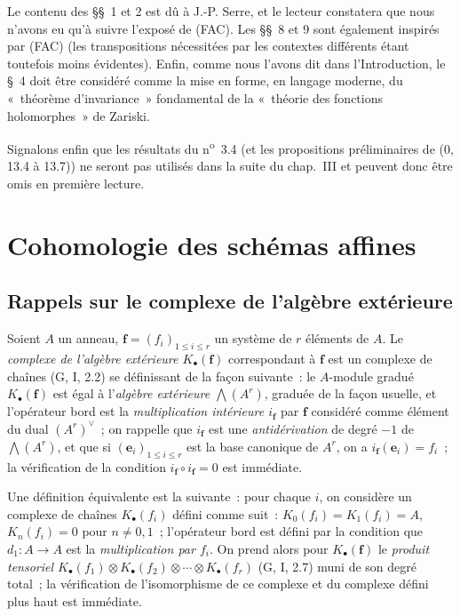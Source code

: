 
Le contenu des \S\S~1 et 2 est dû à J.-P. Serre, et le lecteur constatera que
nous n'avons eu qu'à suivre l'exposé de (FAC). Les \S\S~8 et 9 sont également
inspirés par (FAC) (les transpositions nécessitées par les contextes
différents étant toutefois moins évidentes). Enfin, comme nous l'avons dit
dans l'Introduction, le \S~4 doit être considéré comme la mise en forme, en
langage moderne, du «~théorème d'invariance~» fondamental de la «~théorie des
fonctions holomorphes~» de Zariski.

Signalons enfin que les résultats du n\textsuperscript{o}~3.4 (et les
propositions préliminaires de (0, 13.4 à 13.7)) ne seront pas utilisés dans la
suite du chap.~III et peuvent donc être omis en première lecture.

\setcounter{section}{0}
\section{Cohomologie des schémas affines}
\label{section:III.1-fr}

\subsection{Rappels sur le complexe de l'algèbre extérieure}
\label{subsection:III.1.1-fr}

\begin{env}[1.1.1]
\label{III.1.1.1-fr}
Soient $A$ un anneau, $\mathbf f=(f_i)_{1\leq i\leq r}$ un système de $r$
éléments de $A$. Le \emph{complexe de l'algèbre extérieure
$K_\bullet(\mathbf f)$} correspondant à $\mathbf f$ est un complexe de chaînes
(G, I, 2.2) se définissant de la façon suivante~: le $A$-module gradué
$K_\bullet(\mathbf f)$ est égal à l'\emph{algèbre extérieure
$\bigwedge(A^r)$}, graduée de la façon usuelle, et l'opérateur bord est la
\emph{multiplication intérieure $i_{\mathbf f}$} par $\mathbf f$ considéré
comme élément du dual $(A^r)^\vee$~; on rappelle que $i_{\mathbf f}$ est une
\emph{antidérivation} de degré $-1$ de $\bigwedge(A^r)$, et que si
$(\mathbf e_i)_{1\leq i\leq r}$ est la base canonique de $A^r$, on a
$i_{\mathbf f}(\mathbf e_i)=f_i$~; la vérification de la condition
$i_{\mathbf f}\circ i_{\mathbf f}=0$ est immédiate.

Une définition équivalente est la suivante~: pour chaque $i$, on considère
un complexe de chaînes $K_\bullet(f_i)$ défini comme suit~:
$K_0(f_i)=K_1(f_i)=A$, $K_n(f_i)=0$ pour $n\neq0,1$~; l'opérateur bord est
défini par la condition que $d_1:A\to A$ est la \emph{multiplication par
$f_i$}. On prend alors pour $K_\bullet(\mathbf f)$ le \emph{produit tensoriel
$K_\bullet(f_1)\otimes K_\bullet(f_2)\otimes\cdots\otimes K_\bullet(f_r)$}
(G, I, 2.7) muni de son degré total~; la vérification de l'isomorphisme de ce
complexe et du complexe défini plus haut est immédiate.
\end{env}

